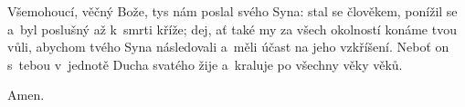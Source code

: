 \mbox{}

Všemohoucí, věčný Bože, tys nám poslal svého Syna: stal se člověkem, ponížil se a~byl poslušný až k~smrti kříže; dej, ať také my za všech okolností konáme tvou vůli, abychom tvého Syna následovali a~měli účast na jeho vzkříšení. Neboť on s~tebou v~jednotě Ducha svatého žije a~kraluje po všechny věky věků.

\Rbardot{} Amen.
